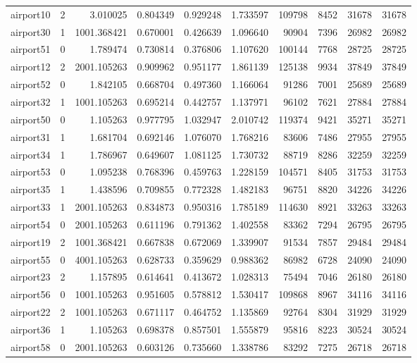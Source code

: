 \begin{longtable}{|l|r|r|r|r|r|r|r|r|r|}
airport10 & 2 & 3.010025 & 0.804349 & 0.929248 & 1.733597 & 109798 & 8452 & 31678 & 31678 \\
airport30 & 1 & 1001.368421 & 0.670001 & 0.426639 & 1.096640 & 90904 & 7396 & 26982 & 26982 \\
airport51 & 0 & 1.789474 & 0.730814 & 0.376806 & 1.107620 & 100144 & 7768 & 28725 & 28725 \\
airport12 & 2 & 2001.105263 & 0.909962 & 0.951177 & 1.861139 & 125138 & 9934 & 37849 & 37849 \\
airport52 & 0 & 1.842105 & 0.668704 & 0.497360 & 1.166064 & 91286 & 7001 & 25689 & 25689 \\
airport32 & 1 & 1001.105263 & 0.695214 & 0.442757 & 1.137971 & 96102 & 7621 & 27884 & 27884 \\
airport50 & 0 & 1.105263 & 0.977795 & 1.032947 & 2.010742 & 119374 & 9421 & 35271 & 35271 \\
airport31 & 1 & 1.681704 & 0.692146 & 1.076070 & 1.768216 & 83606 & 7486 & 27955 & 27955 \\
airport34 & 1 & 1.786967 & 0.649607 & 1.081125 & 1.730732 & 88719 & 8286 & 32259 & 32259 \\
airport53 & 0 & 1.095238 & 0.768396 & 0.459763 & 1.228159 & 104571 & 8405 & 31753 & 31753 \\
airport35 & 1 & 1.438596 & 0.709855 & 0.772328 & 1.482183 & 96751 & 8820 & 34226 & 34226 \\
airport33 & 1 & 2001.105263 & 0.834873 & 0.950316 & 1.785189 & 114630 & 8921 & 33263 & 33263 \\
airport54 & 0 & 2001.105263 & 0.611196 & 0.791362 & 1.402558 & 83362 & 7294 & 26795 & 26795 \\
airport19 & 2 & 1001.368421 & 0.667838 & 0.672069 & 1.339907 & 91534 & 7857 & 29484 & 29484 \\
airport55 & 0 & 4001.105263 & 0.628733 & 0.359629 & 0.988362 & 86982 & 6728 & 24090 & 24090 \\
airport23 & 2 & 1.157895 & 0.614641 & 0.413672 & 1.028313 & 75494 & 7046 & 26180 & 26180 \\
airport56 & 0 & 1001.105263 & 0.951605 & 0.578812 & 1.530417 & 109868 & 8967 & 34116 & 34116 \\
airport22 & 2 & 1001.105263 & 0.671117 & 0.464752 & 1.135869 & 92764 & 8304 & 31929 & 31929 \\
airport36 & 1 & 1.105263 & 0.698378 & 0.857501 & 1.555879 & 95816 & 8223 & 30524 & 30524 \\
airport58 & 0 & 2001.105263 & 0.603126 & 0.735660 & 1.338786 & 83292 & 7275 & 26718 & 26718 \\

\end{longtable}
